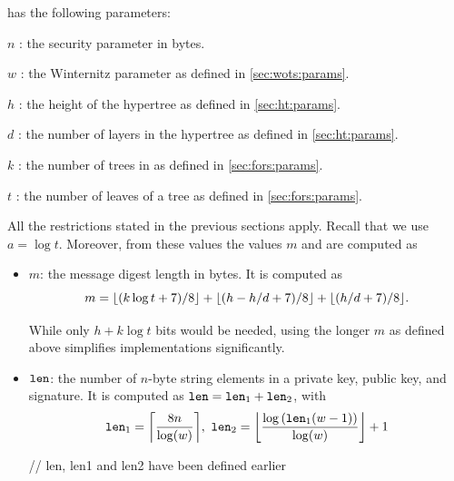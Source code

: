 \spx has the following parameters:
\begin{description}
 \item  $n$ : the security parameter in bytes.
 \item  $w$ : the Winternitz parameter as defined in \autoref{sec:wots:params}.
 \item  $h$ : the height of the hypertree as defined in \autoref{sec:ht:params}.
 \item  $d$ : the number of layers in the hypertree as defined in \autoref{sec:ht:params}.
 \item  $k$ : the number of trees in \fors as defined in \autoref{sec:fors:params}.
 \item  $t$ : the number of leaves of a \fors tree as defined in \autoref{sec:fors:params}.
\end{description}


All the restrictions stated in the previous sections apply. Recall that
we use $a = \log t$. Moreover, from these values the values $m$ and \len are
computed as
\begin{itemize}
  \item $m$: the message digest length in bytes.
  It is computed as
  $$m=\lfloor(k\log t +7)/ 8\rfloor + \lfloor(h - h/d +7)/ 8\rfloor + \lfloor(h / d +7)/ 8\rfloor.$$


  While only $h + k\log t$ bits would be needed, using the longer $m$ as defined
  above simplifies implementations significantly.
  \item $\texttt{len}$: the number of $n$-byte string elements in a \wotsp private
        key, public key, and signature. It is computed as $\texttt{len} =
        \texttt{len}_1 + \texttt{len}_2$, with
        \begin{equation*}
          \len_1 = \ceil*{\frac{8n}{\log(w)}},\
          \len_2 = \floor*{\frac{\log{(\len_1(w - 1))}}{\log(w)}} + 1
        \end{equation*}

\begin{code}
  // len, len1 and len2 have been defined earlier
\end{code}
\end{itemize}

